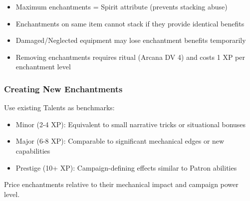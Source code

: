\begin{itemize}
\item Maximum enchantments = Spirit attribute (prevents stacking abuse)
\item Enchantments on same item cannot stack if they provide identical benefits
\item Damaged/Neglected equipment may lose enchantment benefits temporarily
\item Removing enchantments requires ritual (Arcana DV 4) and costs 1 XP per enchantment level
\end{itemize}

\subsubsection{Creating New Enchantments}

Use existing Talents as benchmarks:
\begin{itemize}
\item Minor (2-4 XP): Equivalent to small narrative tricks or situational bonuses
\item Major (6-8 XP): Comparable to significant mechanical edges or new capabilities
\item Prestige (10+ XP): Campaign-defining effects similar to Patron abilities
\end{itemize}

Price enchantments relative to their mechanical impact and campaign power level.
